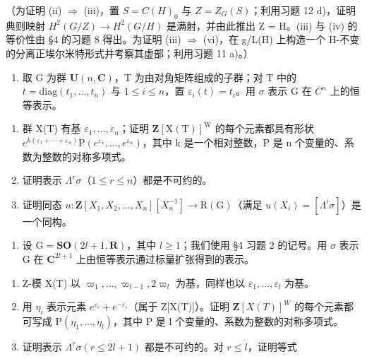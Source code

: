 \begin{enumerate}
（为证明 (ii) \(\Longrightarrow\) (iii)，置 \(S = C(H)_{0}\) 与 \(Z = Z_{G}(S)\)；利用习题 12 d)，证明典则映射 \(H^{2}(G/Z) \to H^{2}(G/H)\) 是满射，并由此推出 Z = H。(iii) 与 (iv) 的等价性由 §4 的习题 8 得出。为证明 (iii) \(\Longrightarrow\) (vi)，在 g/L(H) 上构造一个 H-不变的分离正埃尔米特形式并考察其虚部；利用习题 11 a)。）


\begin{enumerate}
\def\labelenumi{\arabic{enumi})}
\tightlist
\item
  取 G 为群 \(\mathbf{U}(n,\mathbf{C})\)，T 为由对角矩阵组成的子群；对 T 中的 \(t = \text{diag}(t_1, \ldots, t_n)\) 与 \(1 \leq i \leq n\)，置 \(\varepsilon_i(t) = t_i\)。用 \(\sigma\) 表示 G 在 \(C^n\) 上的恒等表示。
\end{enumerate}

\begin{enumerate}
\def\labelenumi{\alph{enumi})}
\item
  群 X(T) 有基 \(\varepsilon_{1},\ldots,\varepsilon_{n}\)；证明 \(\mathbf{Z}[\mathrm{X}(\mathrm{T})]^{\mathrm{W}}\) 的每个元素都具有形状 \(e^{k(\varepsilon_{1}+\cdots+\varepsilon_{n})}\mathrm{P}(e^{\varepsilon_{1}},\ldots,e^{\varepsilon_{n}})\)，其中 k 是一个相对整数，P 是 n 个变量的、系数为整数的对称多项式。
\item
  证明表示 \(\Lambda^r\sigma\)（\(1 \leq r \leq n\)）都是不可约的。
\item
  证明同态 \(u: \mathbf{Z}[X_1, X_2, \ldots, X_n][X_n^{-1}] \to \mathrm{R}(\mathrm{G})\)（满足 \(u(X_i) = [\Lambda^i \sigma]\)）是一个同构。
\end{enumerate}

\begin{enumerate}
\def\labelenumi{\arabic{enumi})}
\setcounter{enumi}{1}
\tightlist
\item
  设 \(\mathrm{G} = \mathbf{SO}(2l + 1, \mathbf{R})\)，其中 \(l \geq 1\)；我们使用 §4 习题 2 的记号。用 \(\sigma\) 表示 \(\mathrm{G}\) 在 \(\mathbf{C}^{2l + 1}\) 上由恒等表示通过标量扩张得到的表示。
\end{enumerate}

\begin{enumerate}
\def\labelenumi{\alph{enumi})}
\item
  Z-模 X(T) 以 \(\varpi_{1},\ldots,\varpi_{l-1},2\varpi_{l}\) 为基，同样也以 \(\varepsilon_{1},\ldots,\varepsilon_{l}\) 为基。
\item
  用 \(\eta_{i}\) 表示元素 \(e^{\varepsilon_{i}} + e^{-\varepsilon_{i}}\)（属于 Z{[}X(T){]}）。证明 \(\mathbf{Z}[X(T)]^{W}\) 的每个元素都可写成 \(\mathrm{P}(\eta_{1}, \ldots, \eta_{l})\)，其中 P 是 l 个变量的、系数为整数的对称多项式。
\item
  证明表示 \(\Lambda^r\sigma (r\leq 2l + 1)\) 都是不可约的。对 \(r\leq l\)，证明等式
\end{enumerate}


\end{enumerate}
